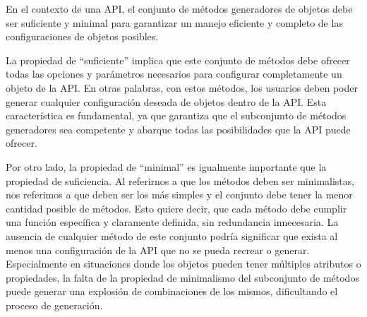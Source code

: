 


En el contexto de una API, el conjunto de métodos generadores de objetos debe ser suficiente y minimal para garantizar un manejo eficiente y completo de las configuraciones de objetos posibles.

La propiedad de ``suficiente'' implica que este conjunto de métodos debe ofrecer todas las opciones y parámetros necesarios para configurar completamente un objeto de la API. En otras palabras, con estos métodos, los usuarios deben poder generar cualquier configuración deseada de objetos dentro de la API. Esta característica es fundamental, ya que garantiza que el subconjunto de métodos generadores sea competente y abarque todas las posibilidades que la API puede ofrecer.

Por otro lado, la propiedad de ``minimal'' es igualmente importante que la propiedad de suficiencia. Al referirnos a que los métodos deben ser minimalistas, nos referimos a que deben ser los más simples  y el conjunto debe tener la menor cantidad posible de métodos. Esto quiere decir, que cada método debe cumplir una función específica y claramente definida, sin redundancia innecesaria. La ausencia de cualquier método de este conjunto podría significar que exista al menos una configuración de la API que no se pueda recrear o generar. Especialmente en situaciones donde los objetos pueden tener múltiples atributos o propiedades, la falta de la propiedad de minimalismo del subconjunto de métodos puede generar una explosión de combinaciones de los mismos, dificultando el proceso de generación.

